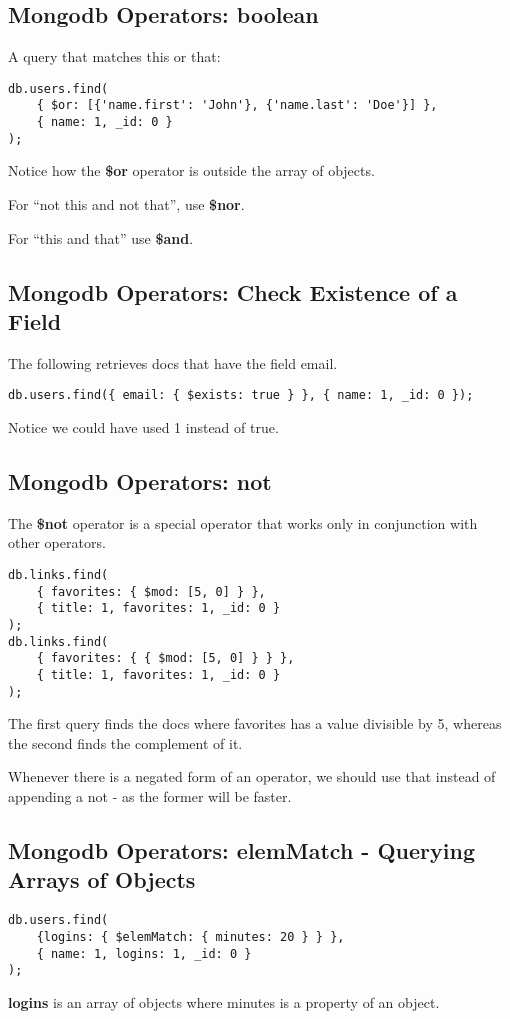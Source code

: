 \documentclass[a4paper, 12pt]{article}
\begin{document}
\subsection{Mongodb Operators: boolean}
A query that matches this or that:
\begin{verbatim}
db.users.find(
	{ $or: [{'name.first': 'John'}, {'name.last': 'Doe'}] },
	{ name: 1, _id: 0 }
);
\end{verbatim}
Notice how the \textbf{\$or} operator is outside the array of objects. 

For ``not this and not that'', use \textbf{\$nor}.

For ``this and that'' use \textbf{\$and}.
\subsection{Mongodb Operators: Check Existence of a Field}
The following retrieves docs that have the field email.
\begin{verbatim}
db.users.find({ email: { $exists: true } }, { name: 1, _id: 0 });
\end{verbatim}
Notice we could have used 1 instead of true.
\subsection{Mongodb Operators: not}
The \textbf{\$not} operator is a special operator that works only in conjunction with other operators.
\begin{verbatim}
db.links.find(
	{ favorites: { $mod: [5, 0] } }, 
	{ title: 1, favorites: 1, _id: 0 }
);
db.links.find(
	{ favorites: { { $mod: [5, 0] } } },
	{ title: 1, favorites: 1, _id: 0 }
);
\end{verbatim}
The first query finds the docs where favorites has a value divisible by 5, whereas the second finds the complement of it.

Whenever there is a negated form of an operator, we should use that instead of appending a not - as the former will be faster.
\subsection{Mongodb Operators: elemMatch - Querying Arrays of Objects}
\begin{verbatim}
db.users.find(
	{logins: { $elemMatch: { minutes: 20 } } }, 
	{ name: 1, logins: 1, _id: 0 }
);
\end{verbatim}
\textbf{logins} is an array of objects where minutes is a property of an object.
\end{document}

